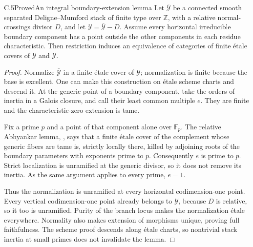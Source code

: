 \begin{statement}{C.5}{Proved}{An integral boundary-extension lemma}
Let $\overline{\mathcal Y}$ be a connected smooth separated
Deligne--Mumford stack of finite type over $\mathbb Z$, with a
relative normal-crossings divisor $D$, and let
$\mathcal Y=\overline{\mathcal Y}-D$. Assume every horizontal
irreducible boundary component has a point outside the other
components in each residue characteristic. Then restriction
induces an equivalence of categories of finite \'etale covers
of $\overline{\mathcal Y}$ and $\mathcal Y$.
\end{statement}
\begin{proof}
Normalize $\overline{\mathcal Y}$ in a finite \'etale cover
of $\mathcal Y$; normalization is finite because the base is
excellent. One can make this construction on \'etale scheme
charts and descend it. At the generic point of a boundary
component, take the orders of inertia in a Galois closure,
and call their least common multiple $e$. They are finite
and the characteristic-zero extension is tame.

Fix a prime $p$ and a point of that component alone over
$\mathbb F_p$. The relative Abhyankar lemma,
\citet[Expos\'e XIII, Proposition 5.5]{SGA1}, says that a finite
\'etale cover of the complement whose generic fibers are tame
is, strictly locally there, killed by adjoining roots of the
boundary parameters with exponents prime to $p$. Consequently
$e$ is prime to $p$. Strict localization is unramified at the
generic divisor, so it does not remove its inertia. As the
same argument applies to every prime, $e=1$.

Thus the normalization is unramified at every horizontal
codimension-one point. Every vertical codimension-one point
already belongs to $\mathcal Y$, because $D$ is relative,
so it too is unramified. Purity of the branch locus
\citep[Expos\'e X, Theorem 3.1]{SGA1} makes the normalization
\'etale everywhere. Normality also makes extension of
morphisms unique, proving full faithfulness. The scheme
proof descends along \'etale charts, so nontrivial stack
inertia at small primes does not invalidate the lemma.
\end{proof}

